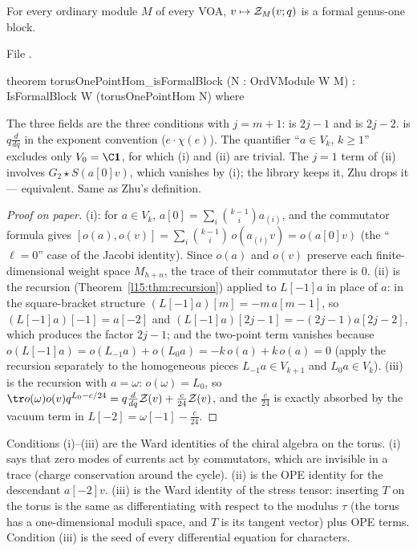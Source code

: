 \begin{theorem}\label{l15:thm:formalblock}
For every ordinary module $M$ of every VOA, $v\mapsto\mathcal{Z}_M(v;q)$ is a formal genus-one block.
\end{theorem}
\noindent File .
\begin{leancode}
theorem torusOnePointHom_isFormalBlock (N : OrdVModule W M) : IsFormalBlock W (torusOnePointHom N) where
\end{leancode}

\begin{dictionary}
The three fields are the three conditions with $j=m+1$:  is $2j-1$ and
 is $2j-2$.  is $q\frac d{dq}$ in the exponent convention ($e\cdot\chi(e)$). The
quantifier ``$a\in V_k$, $k\ge1$'' excludes only $V_0=\C\lfifteenvac$, for which (i) and (ii) are trivial. The $j=1$ term
of (ii) involves $G_2\star S(a[0]v)$, which vanishes by (i); the library keeps it, Zhu drops it --- equivalent. Same as
Zhu's definition.
\end{dictionary}

\begin{proof}[Proof on paper]
(i): for $a\in V_k$, $a[0]=\sum_i\binom{k-1}{i}a_{(i)}$, and the commutator formula gives
$[o(a),o(v)]=\sum_i\binom{k-1}{i}\,o(a_{(i)}v)=o(a[0]v)$ (the ``$\ell=0$'' case of the Jacobi identity). Since $o(a)$ and $o(v)$
preserve each finite-dimensional weight space $M_{h+n}$, the trace of their commutator there is $0$. (ii) is the recursion
(Theorem~\ref{l15:thm:recursion}) applied to $L[-1]a$ in place of $a$: in the square-bracket structure
$(L[-1]a)[m]=-m\,a[m-1]$, so $(L[-1]a)[-1]=a[-2]$ and $(L[-1]a)[2j-1]=-(2j-1)a[2j-2]$, which produces the factor $2j-1$;
and the two-point term vanishes because $o(L[-1]a)=o(L_{-1}a)+o(L_0a)=-k\,o(a)+k\,o(a)=0$ (apply the recursion separately to
the homogeneous pieces $L_{-1}a\in V_{k+1}$ and $L_0a\in V_k$). (iii) is the recursion with $a=\omega$: $o(\omega)=L_0$, so
$\tr o(\omega)o(v)q^{L_0-c/24}=q\frac d{dq}\lfifteenZ(v)+\frac c{24}\lfifteenZ(v)$, and the $\frac c{24}$ is exactly absorbed
by the vacuum term in $L[-2]=\omega[-1]-\frac c{24}$.
\end{proof}

\begin{physics}
Conditions (i)--(iii) are the Ward identities of the chiral algebra on the torus. (i) says that zero modes of currents act
by commutators, which are invisible in a trace (charge conservation around the cycle). (ii) is the OPE identity for the
descendant $a[-2]v$. (iii) is the Ward identity of the stress tensor: inserting $T$ on the torus is the same as
differentiating with respect to the modulus $\tau$ (the torus has a one-dimensional moduli space, and $T$ is its tangent
vector) plus OPE terms. Condition (iii) is the seed of every differential equation for characters.
\end{physics}

